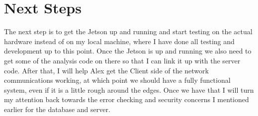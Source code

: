 \documentclass[onecolumn, draftclsnofoot,10pt, compsoc]{IEEEtran}
\begin{document}
\section{Next Steps}
The next step is to get the Jetson up and running and start testing on the actual hardware instead of on my local machine, where I have done all testing and development up to this point.
Once the Jetson is up and running we also need to get some of the analysis code on there so that I can link it up with the server code.
After that, I will help Alex get the Client side of the network communications working, at which point we should have a fully functional system, even if it is a little rough around the edges.
Once we have that I will turn my attention back towards the error checking and security concerns I mentioned earlier for the database and server.
\end{document}
